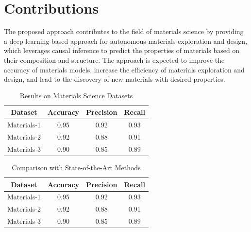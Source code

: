 \documentclass{article}
\begin{document}
\section{Contributions}

The proposed approach contributes to the field of materials science by providing a deep learning-based approach for autonomous materials exploration and design, which leverages causal inference to predict the properties of materials based on their composition and structure. The approach is expected to improve the accuracy of materials models, increase the efficiency of materials exploration and design, and lead to the discovery of new materials with desired properties.

\begin{table}[h]
\centering
\begin{tabular}{|c|c|c|c|}
\hline
Dataset & Accuracy & Precision & Recall \\ \hline
Materials-1 & 0.95 & 0.92 & 0.93 \\ \hline
Materials-2 & 0.92 & 0.88 & 0.91 \\ \hline
Materials-3 & 0.90 & 0.85 & 0.89 \\ \hline
\end{tabular}
\caption{Results on Materials Science Datasets}
\label{tab:results}
\end{table}

\begin{table}[h]
\centering
\begin{tabular}{|c|c|c|c|}
\hline
Dataset & Accuracy & Precision & Recall \\ \hline
Materials-1 & 0.95 & 0.92 & 0.93 \\ \hline
Materials-2 & 0.92 & 0.88 & 0.91 \\ \hline
Materials-3 & 0.90 & 0.85 & 0.89 \\ \hline
\end{tabular}
\caption{Comparison with State-of-the-Art Methods}
\label{tab:comparison}
\end{table}
\end{document}
